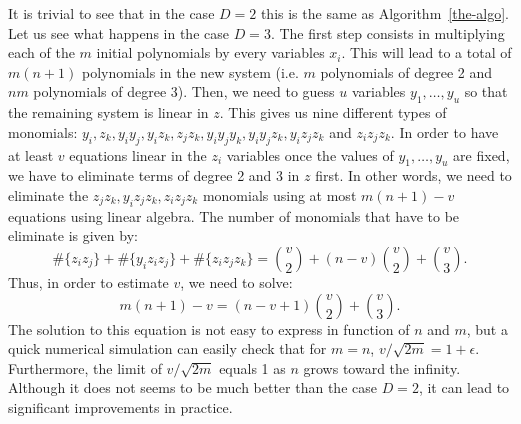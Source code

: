 \documentclass[a4paper,UKenglish,cleveref, autoref]{lipics-v2019}
\begin{document}
It is trivial to see that in the case $D=2$ this is the same as Algorithm~\ref{the-algo}.
Let us see what happens in the case $D=3$. The first step consists in multiplying each of
the $m$ initial polynomials by every variables $x_i$. This will lead to a total of
$m(n+1)$ polynomials in the new system (i.e. $m$ polynomials of degree 2 and $nm$ polynomials
of degree 3). Then, we need to guess $u$ variables $y_1, \dots, y_u$ so that the remaining system
is linear in $z$. This gives us nine different types of monomials:
$y_i, z_k, y_iy_j, y_iz_k, z_jz_k, y_iy_jy_k, y_iy_jz_k, y_iz_jz_k$ and $z_iz_jz_k$.
In order to have at least $v$ equations linear in the $z_i$ variables once the values of $y_1, \dots, y_u$
are fixed, we have to eliminate terms of degree 2 and 3 in $z$ first. In other words,
we need to eliminate the $z_jz_k, y_iz_jz_k, z_iz_jz_k$ monomials using at most $m(n+1) - v$ equations
using linear algebra. The number of monomials that have to be eliminate is given by:
\[
  \#\{z_iz_j\} + \#\{y_iz_iz_j\} +\#\{z_iz_jz_k\}
 = \binom{v}{2} + (n-v)\binom{v}{2} +\binom{v}{3}.
\]
Thus, in order to estimate $v$, we need to solve:
\[
 m(n+1) -v = (n-v +1)\binom{v}{2} + \binom{v}{3}.
\]
The solution to this equation is not easy to express in function of $n$ and $m$, but a quick
numerical simulation can easily check that for $m=n$, $v/\sqrt{2m} = 1+\epsilon$. Furthermore,
the limit of $v/\sqrt{2m}$ equals 1 as $n$ grows toward the infinity. Although it does not seems
to be much better than the case $D=2$, it can lead to significant improvements in
practice.
\end{document}
